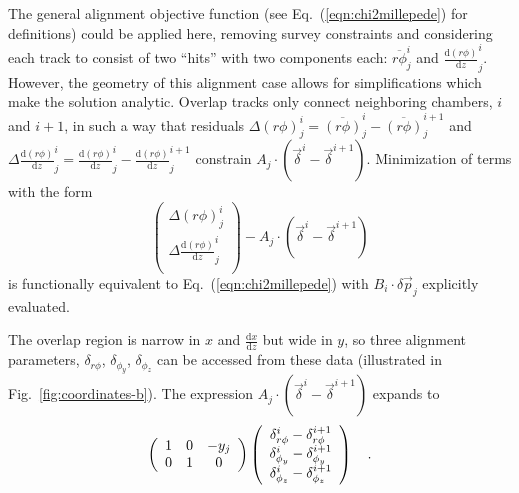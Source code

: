 The general alignment objective function (see
Eq.~(\ref{eqn:chi2millepede}) for definitions) could be applied here,
removing survey constraints and considering each track to consist of
two ``hits'' with two components each: $\overline{r\phi}^i_j$ and
$\frac{\textrm{d}(r\phi)}{\textrm{d}z}^i_j$.  However, the geometry of this
alignment case allows for simplifications which make the solution
analytic.  Overlap tracks only connect neighboring chambers, $i$ and
$i+1$, in such a way that residuals $\Delta (r\phi)^i_j
= \overline{(r\phi)}^i_j - \overline{(r\phi)}^{i+1}_j$ and
$\Delta \frac{\textrm{d}(r\phi)}{\textrm{d}z}^i_j = \frac{\textrm{d}(r\phi)}{\textrm{d}z}^i_j
- \frac{\textrm{d}(r\phi)}{\textrm{d}z}^{i+1}_j$ constrain
$A_j \cdot \left(\vec{\delta}^i - \vec{\delta}^{i+1}\right)$.
Minimization of terms with the form
\begin{equation}
\left(\begin{array}{c}
\Delta (r\phi)^i_j \\
\Delta \frac{\textrm{d}(r\phi)}{\textrm{d}z}^i_j \\
\end{array} \right) - A_j \cdot \left(\vec{\delta}^i - \vec{\delta}^{i+1}\right)
\end{equation}
is functionally equivalent to Eq.~(\ref{eqn:chi2millepede}) with
$B_i \cdot \delta \vec{p}_j$ explicitly evaluated.

The overlap region is narrow in $x$ and $\frac{\textrm{d}x}{\textrm{d}z}$ but wide in
$y$, so three alignment parameters, $\delta_{r\phi}$,
$\delta_{\phi_y}$, $\delta_{\phi_z}$ can be accessed from these data
(illustrated in Fig.~\ref{fig:coordinates-b}).  The expression
$A_j \cdot \left(\vec{\delta}^i - \vec{\delta}^{i+1}\right)$ expands to
\begin{equation}
\left(\begin{array}{c c c}
1 & 0 & -y_j \\
0 & 1 & 0 \\
\end{array}\right)
\left(\begin{array}{c}
\delta_{r\phi}^i - \delta_{r\phi}^{i+1} \\
\delta_{\phi_y}^i - \delta_{\phi_y}^{i+1} \\
\delta_{\phi_z}^i - \delta_{\phi_z}^{i+1} \\
\end{array}\right) \quad\mbox{.}
\end{equation}

